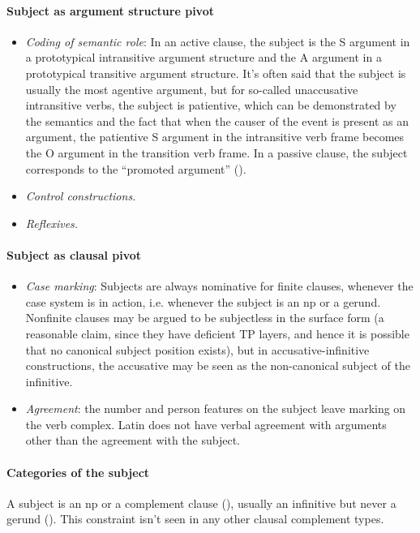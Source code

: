 \documentclass[a4paper, oneside, 12pt]{report}
\begin{document}
\paragraph*{Subject as argument structure pivot}
\begin{itemize}
    \item \emph{Coding of semantic role}: In an active clause, 
    the subject 
    is the S argument in a prototypical intransitive argument structure 
    and the A argument in a prototypical transitive argument structure.
    It's often said that the subject is usually the most agentive argument,
    but for so-called unaccusative intransitive verbs, 
    the subject is patientive,
    which can be demonstrated by the semantics 
    and the fact that when the causer of the event is present as an argument, 
    the patientive S argument in the intransitive verb frame
    becomes the O argument in the transition verb frame.
    In a passive clause, 
    the subject corresponds to the ``promoted argument'' ().  
    \item \emph{Control constructions.} 
    \item \emph{Reflexives.}
\end{itemize}

\paragraph*{Subject as clausal pivot}

\begin{itemize}
    \item \emph{Case marking}: 
    Subjects are always nominative for finite clauses,
    whenever the case system is in action,
    i.e. whenever the subject is an \ac{np} or a gerund. 
    Nonfinite clauses may be argued to be subjectless in the surface form 
    (a reasonable claim, since they have deficient TP layers, 
    and hence it is possible that no canonical subject position exists),
    but in accusative-infinitive constructions, %
    the accusative may be seen as the non-canonical subject of the infinitive.
    \item \emph{Agreement}: 
    the number and person features on the subject leave marking on the verb complex.
    Latin does not have verbal agreement with arguments other than the agreement with the subject.
\end{itemize}

\paragraph*{Categories of the subject} A subject is an \ac{np}  
or a complement clause (), 
usually an infinitive but never a gerund ().
This constraint isn't seen in any other clausal complement types.
\end{document}
